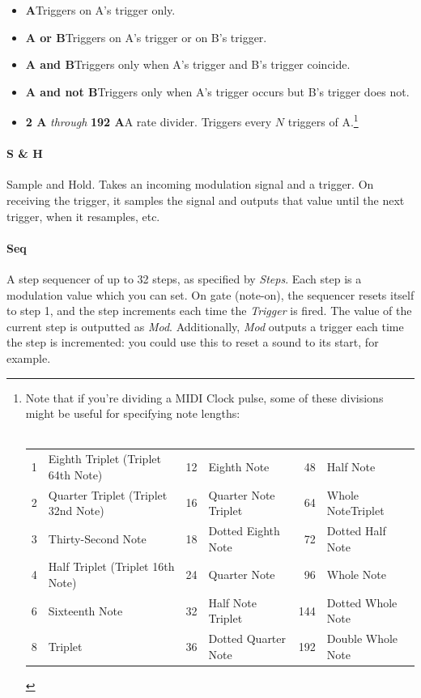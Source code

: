 \documentclass{article}
\begin{document}
\begin{itemize}
\item {\bf A}\quad Triggers on A's trigger only.
\item {\bf A or B}\quad Triggers on A's trigger or on B's trigger.
\item {\bf A and B}\quad Triggers only when A's trigger and B's trigger coincide.
\item {\bf A and not B}\quad Triggers only when A's trigger occurs but B's trigger does not.
\item {\bf 2 A} {\it through} {\bf 192 A}\quad A rate divider.  Triggers every \(N\) triggers of A.\footnote{Note that if you're dividing a MIDI Clock pulse, some of these divisions might be useful for specifying note lengths:\\
\\
\begin{tabular}{rlrlrl}
	1&	Eighth Triplet (Triplet 64th Note)	&12&	Eighth Note							&48&	Half Note		\\
	2&	Quarter Triplet (Triplet 32nd Note)	&16&	Quarter Note Triplet					&64&	Whole NoteTriplet\\
	3&	Thirty-Second Note				&18&	Dotted Eighth Note				&72&	Dotted Half Note\\
	4&	Half Triplet (Triplet 16th Note)		&24&	Quarter Note				&96&	Whole Note\\
	6&	Sixteenth Note					&32&	Half Note Triplet				&144&	Dotted Whole Note\\
	8&	Triplet								&36&	Dotted Quarter Note									&192&	Double Whole Note\\
\end{tabular}\vspace{1em}
}

\end{itemize}

\paragraph{S \& H}  Sample and Hold.  Takes an incoming modulation signal and a trigger.  On receiving the trigger, it samples the signal and outputs that value until the next trigger, when it resamples, etc.

\paragraph{Seq}  A step sequencer of up to 32 steps, as specified by {\it Steps}.  Each step is a modulation value which you can set.  On gate (note-on), the sequencer resets itself to step 1, and the step increments each time the {\it Trigger} is fired.  The value of the current step is outputted as {\it Mod}.  Additionally, {\it Mod} outputs a trigger each time the step is incremented: you could use this to reset a sound to its start, for example. 
\end{document}
